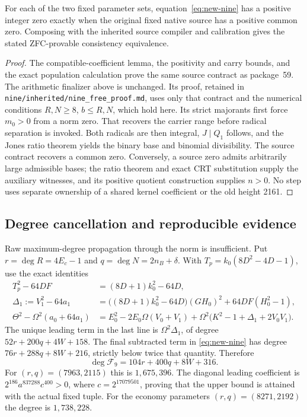 \begin{proposition}
For each of the two fixed parameter sets, equation~\eqref{eq:new-nine}
has a positive integer zero exactly when the original fixed native source
has a positive common zero. Composing with the inherited source compiler
and calibration gives the stated ZFC-provable consistency equivalence.
\end{proposition}
\begin{proof}
The compatible-coefficient lemma, the positivity and carry bounds, and the
exact population calculation prove the same source contract as package~59.
The arithmetic finalizer above is unchanged. Its proof, retained in
\texttt{nine/inherited/nine\_free\_proof.md}, uses only that contract and
the numerical conditions $R,N\ge8$, $b\le R,N$, which hold here.
Its strict majorants first force $m_0>0$ from a norm zero. That recovers the
carrier range before radical separation is invoked. Both radicals are then
integral, $J\mid Q_1$ follows, and the Jones ratio theorem yields the binary
base and binomial divisibility. The source contract recovers a common zero.
Conversely, a source zero admits arbitrarily large admissible bases; the
ratio theorem and exact CRT substitution supply the auxiliary witnesses,
and its positive quotient construction supplies $n>0$. No step uses
separate ownership of a shared kernel coefficient or the old height 2161.
\end{proof}

\subsection{Degree cancellation and reproducible evidence}

Raw maximum-degree propagation through the norm is insufficient. Put
$r=\deg R=4E_c-1$ and $q=\deg N=2n_B+\delta$.
With $T_p=k_0(8D^2-4D-1)$, use the exact identities
\begin{align*}
 T_p^2-64DF&=(8D+1)k_0^2-64D,\\
 \Delta_1:=V_1^2-64a_1
  &=\bigl((8D+1)k_0^2-64D\bigr)(GH_0)^2+64DF(H_0^2-1),\\
 \Theta^2-\Omega^2(a_0+64a_1)
  &=E_0^2-2E_0\Omega(V_0+V_1)
     +\Omega^2\bigl(K^2-1+\Delta_1+2V_0V_1\bigr).
\end{align*}
The unique leading term in the last line is $\Omega^2\Delta_1$, of degree
$52r+200q+4W+158$. The final subtracted term in
\eqref{eq:new-nine} has degree $76r+288q+8W+216$, strictly below twice that
quantity. Therefore
\[
 \deg\mathcal F_9=104r+400q+8W+316.
\]
For $(r,q)=(7963,2115)$ this is $1{,}675{,}396$.
The diagonal leading coefficient is
$2^{186}a^{837288}c^{400}>0$, where $c=2^{17079501}$, proving that the
upper bound is attained with the actual fixed tuple. For the economy
parameters $(r,q)=(8271,2192)$ the degree is $1{,}738{,}228$.

